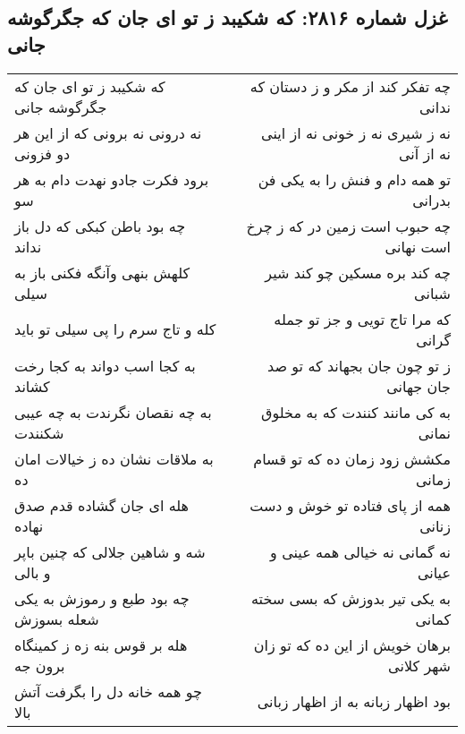 \begin{center}
\section*{غزل شماره ۲۸۱۶: که شکیبد ز تو ای جان که جگرگوشه جانی}
\label{sec:2816}
\begin{longtable}{l p{0.5cm} r}
که شکیبد ز تو ای جان که جگرگوشه جانی
&&
چه تفکر کند از مکر و ز دستان که ندانی
\\
نه درونی نه برونی که از این هر دو فزونی
&&
نه ز شیری نه ز خونی نه از اینی نه از آنی
\\
برود فکرت جادو نهدت دام به هر سو
&&
تو همه دام و فنش را به یکی فن بدرانی
\\
چه بود باطن کبکی که دل باز نداند
&&
چه حبوب است زمین در که ز چرخ است نهانی
\\
کلهش بنهی وآنگه فکنی باز به سیلی
&&
چه کند بره مسکین چو کند شیر شبانی
\\
کله و تاج سرم را پی سیلی تو باید
&&
که مرا تاج تویی و جز تو جمله گرانی
\\
به کجا اسب دواند به کجا رخت کشاند
&&
ز تو چون جان بجهاند که تو صد جان جهانی
\\
به چه نقصان نگرندت به چه عیبی شکنندت
&&
به کی مانند کنندت که به مخلوق نمانی
\\
به ملاقات نشان ده ز خیالات امان ده
&&
مکشش زود زمان ده که تو قسام زمانی
\\
هله ای جان گشاده قدم صدق نهاده
&&
همه از پای فتاده تو خوش و دست زنانی
\\
شه و شاهین جلالی که چنین باپر و بالی
&&
نه گمانی نه خیالی همه عینی و عیانی
\\
چه بود طبع و رموزش به یکی شعله بسوزش
&&
به یکی تیر بدوزش که بسی سخته کمانی
\\
هله بر قوس بنه زه ز کمینگاه برون جه
&&
برهان خویش از این ده که تو زان شهر کلانی
\\
چو همه خانه دل را بگرفت آتش بالا
&&
بود اظهار زبانه به از اظهار زبانی
\\
\end{longtable}
\end{center}
